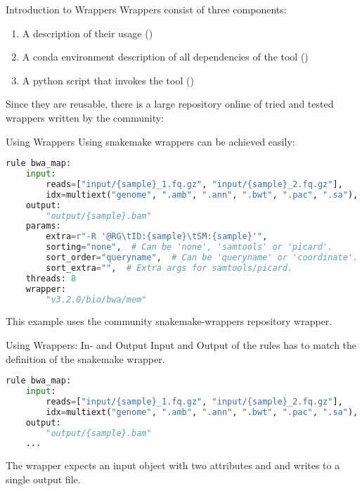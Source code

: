 \begin{frame}{Introduction to Wrappers}
    Wrappers consist of three components:
    \begin{enumerate}
        \item A description of their usage ()
        \item A conda environment description of all dependencies of the tool ()
        \item A python script that invokes the tool ()
    \end{enumerate}
    Since they are reusable, there is a large repository online of tried and tested 
    wrappers written by the community: 
\end{frame}

\begin{frame}[fragile]{Using Wrappers}
    Using snakemake wrappers can be achieved easily:
    \begin{lstlisting}[language=Python,style=Python]
rule bwa_map:
    input:
        reads=["input/{sample}_1.fq.gz", "input/{sample}_2.fq.gz"],
        idx=multiext("genome", ".amb", ".ann", ".bwt", ".pac", ".sa"),
    output:
        "output/{sample}.bam"
    params:
        extra=r"-R '@RG\tID:{sample}\tSM:{sample}'",
        sorting="none",  # Can be 'none', 'samtools' or 'picard'.
        sort_order="queryname",  # Can be 'queryname' or 'coordinate'.
        sort_extra="",  # Extra args for samtools/picard.
    threads: 8
    wrapper:
        "v3.2.0/bio/bwa/mem"
    \end{lstlisting}
    \begin{docs}
        This example uses the community snakemake-wrappers repository  wrapper.
    \end{docs}
\end{frame}

\begin{frame}[fragile]{Using Wrappers: In- and Output}
    Input and Output of the rules has to match the definition of the snakemake wrapper.
    \begin{lstlisting}[language=Python,style=Python]
rule bwa_map:
    input:
        reads=["input/{sample}_1.fq.gz", "input/{sample}_2.fq.gz"],
        idx=multiext("genome", ".amb", ".ann", ".bwt", ".pac", ".sa"),
    output:
        "output/{sample}.bam"
    ...
    \end{lstlisting}
    \begin{docs}
        The  wrapper expects an input object with two attributes
         and  and writes to a single output file.
    \end{docs}
\end{frame}


